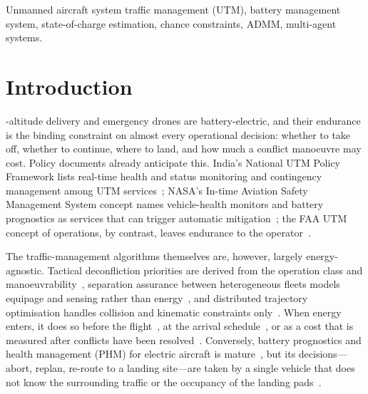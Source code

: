 \documentclass[journal]{IEEEtran}
\begin{document}
\begin{IEEEkeywords}
Unmanned aircraft system traffic management (UTM), battery management system, state-of-charge estimation, chance constraints, ADMM, multi-agent systems.
\end{IEEEkeywords}

\section{Introduction}
-altitude delivery and emergency drones are battery-electric, and their endurance is the binding constraint on almost every operational decision: whether to take off, whether to continue, where to land, and how much a conflict manoeuvre may cost. Policy documents already anticipate this. India's National UTM Policy Framework lists real-time health and status monitoring and contingency management among UTM services~\cite{indiaUTM2021}; NASA's In-time Aviation Safety Management System concept names vehicle-health monitors and battery prognostics as services that can trigger automatic mitigation~\cite{ellis2021iasms}; the FAA UTM concept of operations, by contrast, leaves endurance to the operator~\cite{faa2020conops}.

The traffic-management algorithms themselves are, however, largely energy-agnostic. Tactical deconfliction priorities are derived from the operation class and manoeuvrability~\cite{jover2022priority}, separation assurance between heterogeneous fleets models equipage and sensing rather than energy~\cite{sharifi2026separation}, and distributed trajectory optimisation handles collision and kinematic constraints only~\cite{ni2022admm}. When energy enters, it does so before the flight~\cite{liu2017energy}, at the arrival schedule~\cite{kleinbekman2018evtol}, or as a cost that is measured after conflicts have been resolved~\cite{zongo2026overhead}. Conversely, battery prognostics and health management (PHM) for electric aircraft is mature~\cite{saha2011bhm,bole2014online,kulkarni2018remaining,hogge2024octocopter,kulkarni2024thermal}, but its decisions---abort, replan, re-route to a landing site---are taken by a single vehicle that does not know the surrounding traffic or the occupancy of the landing pads~\cite{taye2025safe,quinones2020decision,montazeri2024health,baculi2019onboard}.
\end{document}
